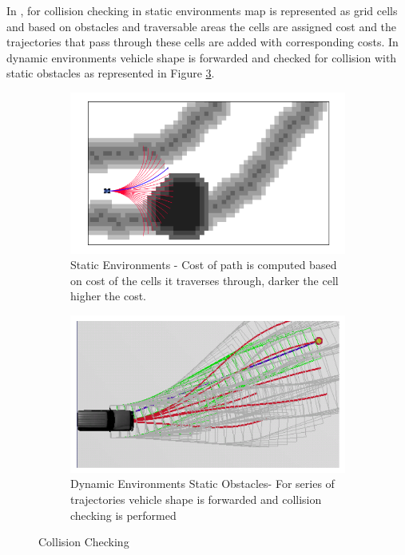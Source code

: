In \cite{kolski_thesis}, for collision checking in static environments map is represented as grid cells and based on obstacles and traversable areas the cells are assigned cost and the trajectories that pass through these cells are added with corresponding costs. In dynamic environments vehicle shape is forwarded and checked for collision with static obstacles as represented in Figure \ref{kolskicollison}. 
\begin{figure}
	\centering
	\begin{subfigure}{.50\textwidth}
		\centering
		\includegraphics[width=1.0\linewidth]{Images/related_work/kolskistaticobst.png}
		\caption{Static Environments - Cost of path is computed based on cost of the cells it traverses through, darker the cell higher the cost.}
		\label{kolski1}
	\end{subfigure}%
	\begin{subfigure}{.50\textwidth}
		\centering
		\includegraphics[width=1.0\linewidth]{Images/related_work/dynamiccollsionkolski.png}
		\caption{Dynamic Environments Static Obstacles- For series of trajectories vehicle shape is forwarded and collision checking is performed}
		\label{kolski2}
	\end{subfigure}
	\caption{Collision Checking \cite{kolski_thesis}}
	\label{kolskicollison}
\end{figure}

